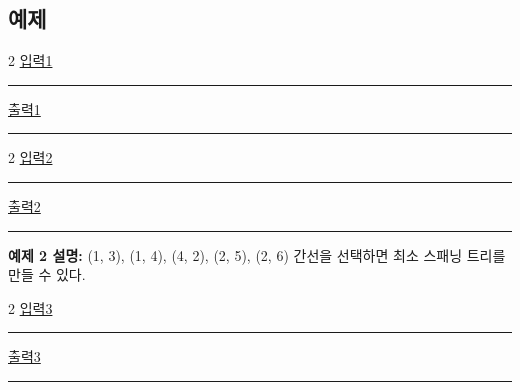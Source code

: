 \documentclass{article}
\def\inputdataname{입력} %
\def\outputdataname{출력} %
\newcommand{\iodataNo}[1]{%
	\begin{minipage}{\textwidth}
		\begin{multicols}{2}
			\href{run:input#1.txt}{\inputdataname#1} \\
			\rule{\columnwidth}{1pt}
			
			\columnbreak
			\href{run:output#1.txt}{\outputdataname#1} \\
			\rule{\columnwidth}{1pt}
			
		\end{multicols}
		\vspace{\baselineskip}
	\end{minipage}
}
\begin{document}
\subsection{예제}

\iodataNo{1}
\iodataNo{2}



\textbf{예제 2 설명:} (1, 3), (1, 4), (4, 2), (2, 5), (2, 6) 간선을 선택하면 최소 스패닝 트리를 만들 수 있다. \newline

\iodataNo{3}

\newpage
\end{document}
